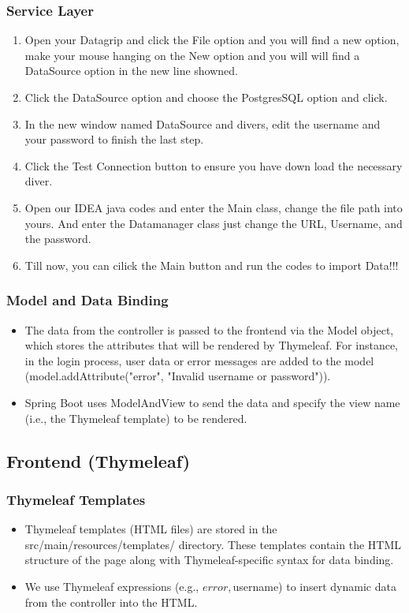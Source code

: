\documentclass{article}
\begin{document}
\subsubsection{Service Layer}
\begin{enumerate}
\item Open your Datagrip and click the File option and you will find a new option, make your mouse hanging on the New option and you will will find a DataSource option in the new line showned.
\item Click the DataSource option and choose the PostgresSQL option and click.
\item In the new window named DataSource and divers, edit the username and your password to finish the last step.
\item Click the Test Connection button to ensure you have down load the necessary diver.
\item Open our IDEA java codes and enter the Main class, change the file path into yours. And enter the Datamanager class just change the URL, Username, and the password.
\item Till now, you can cilick the Main button and run the codes to import Data!!!
\end{enumerate}
\subsubsection{Model and Data Binding}
\begin{itemize}
    \item{The data from the controller is passed to the frontend via the Model object, which stores the attributes that will be rendered by Thymeleaf. For instance, in the login process, user data or error messages are added to the model (model.addAttribute("error", "Invalid username or password")).}
    \item{Spring Boot uses ModelAndView to send the data and specify the view name (i.e., the Thymeleaf template) to be rendered.}
\end{itemize}
\subsection{Frontend (Thymeleaf)}
\subsubsection{Thymeleaf Templates}
\begin{itemize}
    \item{Thymeleaf templates (HTML files) are stored in the src/main/resources/templates/ directory. These templates contain the HTML structure of the page along with Thymeleaf-specific syntax for data binding.}
    \item{We use Thymeleaf expressions (e.g., ${error}, ${username}) to insert dynamic data from the controller into the HTML.}
\end{itemize}
\end{document}

